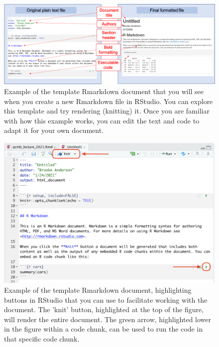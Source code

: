 \documentclass[]{tufte-book}
\begin{document}
\begin{figure}
\includegraphics[width=\textwidth]{figures/rmarkdownoriginalfinal} \caption[Example of the template Rmarkdown document that you will see when you create a new Rmarkdown file in RStudio]{Example of the template Rmarkdown document that you will see when you create a new Rmarkdown file in RStudio. You can explore this template and try rendering (knitting) it. Once you are familiar with how this example works, you can edit the text and code to adapt it for your own document.}\label{fig:rmarkdownoriginalfinal}
\end{figure}

\begin{figure}
\includegraphics[width=\textwidth]{figures/rmarkdown_template2} \caption[Example of the template Rmarkdown document, highlighting buttons in RStudio that you can use to facilitate working with the document]{Example of the template Rmarkdown document, highlighting buttons in RStudio that you can use to facilitate working with the document. The 'knit' button, highlighted at the top of the figure, will render the entire document. The green arrow, highlighted lower in the figure within a code chunk, can be used to run the code in that specific code chunk.}\label{fig:rmarkdowntemplate2}
\end{figure}
\end{document}
